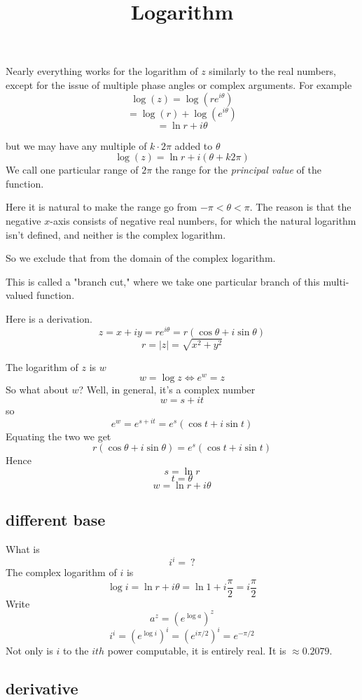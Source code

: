 \documentclass[11pt, oneside]{article}
\title{Logarithm}
\date{}
\begin{document}
\maketitle
\Large

Nearly everything works for the logarithm of $z$ similarly to the real numbers, except for the issue of multiple phase angles or complex arguments.  For example
\[ \log(z) = \log(re^{i\theta}) \]
\[ = \log(r) + \log(e^{i\theta}) \]
\[ = \ln r + i \theta \]

but we may have any multiple of $k \cdot 2 \pi$ added to $\theta$
\[ \log(z) = \ln r + i (\theta + k2 \pi) \]
We call one particular range of $2 \pi$ the range for the \emph{principal value} of the function.  

Here it is natural to make the range go from $-\pi < \theta < \pi$.  The reason is that the negative $x$-axis consists of negative real numbers, for which the natural logarithm isn't defined, and neither is the complex logarithm.  

So we exclude that from the domain of the complex logarithm.  

This is called a "branch cut," where we take one particular branch of this multi-valued function.

Here is a derivation.  
\[ z = x + iy = re^{i\theta} = r(\cos \theta + i \sin \theta) \]
\[ r = |z| = \sqrt{x^2 + y^2} \]

The logarithm of $z$ is $w$
\[ w = \log z \iff e^w = z \]
So what about $w$? Well, in general, it's a complex number
\[ w = s + it \]
so
\[ e^w = e^{s + it} = e^s (\cos t + i \sin t) \]
Equating the two we get
\[ r (\cos \theta + i \sin \theta) = e^s (\cos t + i \sin t) \]
Hence
\[ s = \ln r \]
\[ t = \theta \]
\[ w = \ln r + i \theta \]

\subsection*{different base}

What is 
\[ i^i = \  ? \]
The complex logarithm of $i$ is
\[ \log i = \ln r + i \theta = \ln 1 + i \frac{\pi}{2} =  i \frac{\pi}{2} \]
 Write
\[ a^z = (e^{\log a})^z \]
\[ i^i = (e^{\log i})^i = (e^{i \pi/2})^i = e^{-\pi/2} \]
Not only is $i$ to the $ith$ power computable, it is entirely real.  It is $\approx 0.2079$.
\subsection*{derivative}
\end{document}
